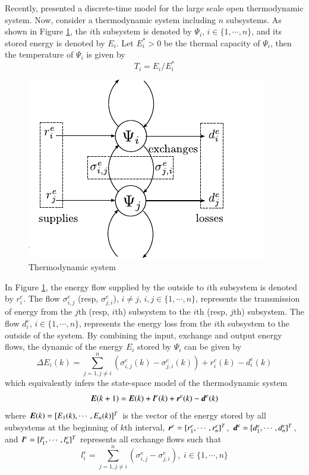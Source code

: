 \documentclass[preprint,authoryear,12pt]{elsarticle}
\renewcommand{\vec}[1]{\mbox{\boldmath$#1$}}
\begin{document}
Recently, \citet{haddad_thermodynamic_2005} presented a discrete-time model for the large scale open thermodynamic system. Now, consider a thermodynamic system including $n$ subsystems. As shown in Figure \ref{fig:Ther_Sys}, the $i$th subsystem is denoted by $\Psi_i$, $i\in \{1,\cdots,n\}$, and its stored energy is denoted by $E_i$. Let $E_i^*>0$ be the thermal capacity of $\Psi_i$, then the temperature of $\Psi_i$ is given by
\begin{equation}\label{equ:temperature}
    T_i= {E_i}/{E^*_i}
\end{equation}

\begin{figure}[ht]
  \centering
  \includegraphics{pics/HModel}
  \caption{Thermodynamic system}
  \label{fig:Ther_Sys}
\end{figure}

In Figure \ref{fig:Ther_Sys}, the energy flow supplied by the outside to $i$th subsystem is denoted by $r^e_i$. The flow $\sigma^e_{i,j}$ (resp, $\sigma^e_{j,i}$), $i\neq j$, $i,j\in \{1,\cdots,n\}$, represents the transmission of energy from the $j$th (resp, $i$th) subsystem to the $i$th (resp, $j$th) subsystem. The flow $d^e_i$, $i\in \{1,\cdots,n\}$, represents the energy loss from the $i$th subsystem to the outside of the system. By combining the input, exchange and output energy flows, the dynamic of the energy $E_i$ stored by $\Psi_i$ can be given by
\begin{equation}\label{equ:Ther_Model_SubSystem}
\Delta E_i(k) = \sum_{j=1,j\neq
i}^{n}(\sigma^e_{i,j}(k)-\sigma^e_{j,i}(k))+r^e_i(k)-d^e_i(k)
\end{equation}
which equivalently infers the state-space model of the thermodynamic system
\begin{equation}\label{equ:Ther_Model}
    \vec{E}(k+1)=\vec{E}(k)+\vec{l}^e(k)+\vec{r}^e(k)-\vec{d}^e(k)
\end{equation}
where $\vec{E}(k)=[E_1(k),\cdots,E_n(k)]^T$ is the vector of the energy stored by all subsystems at the beginning of $k$th interval, $\vec{r}^e=[r^e_1,\cdots,r^e_n]^T$, $\vec{d}^e=[d^e_{1},\cdots,d^e_{n}]^T$, and $\vec{l}^e=[l^e_1,\cdots,l^e_n]^T$ represents all exchange flows such that
\begin{equation*}
l^e_i = \sum_{j=1,j\neq i}^{n}
        (\sigma^e_{i,j}-\sigma^e_{j,i}),
\; i\in \{1,\cdots,n\}
\end{equation*}
\end{document}
